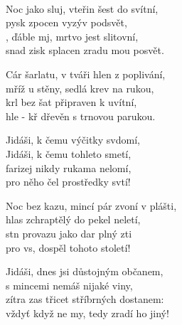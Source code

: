 
\ve{}
 \\
Noc jako sluj, vteřin šest do svítní,\\
pysk zpocen vyzýv podsvět,\\
, ďáble mj, mrtvo jest slitovní,  \\
snad zisk splacen zradu mou posvět.

\ve{}
Cár šarlatu, v tváři hlen z poplivání,\\
mříž u stěny, sedlá krev na rukou,\\
krl bez šat připraven k uvítní,\\
hle - kř dřevěn s trnovou parukou.

\cho{}
Jidáši, k čemu výčitky svdomí,\\
Jidáši, k čemu tohleto smetí,\\
farizej nikdy rukama nelomí,\\
pro něho čel prostředky svtí! \\

\ve{}
Noc bez kazu, mincí pár zvoní v plášti,\\
hlas zchraptělý do pekel neletí,\\
stn provazu jako dar plný zti  \\
pro vs, dospěl tohoto století!

Jidáši, dnes jsi důstojným občanem,\\
s mincemi nemáš nijaké viny,\\
zítra zas třicet stříbrných dostanem:\\
vždyť když ne my, tedy zradí ho jiný!

\esong 